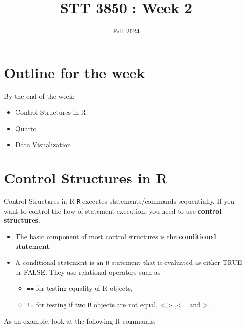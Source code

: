 \documentclass[
  ignorenonframetext,
]{beamer}
\title{STT 3850 : Week 2}
\author{Fall 2024}
\date{}
\institute{Appalachian State University}
\providecommand{\tightlist}{%
  \setlength{\itemsep}{0pt}\setlength{\parskip}{0pt}}
\begin{document}
\frame{\titlepage}

\hypertarget{outline-for-the-week}{%
\section{Outline for the week}\label{outline-for-the-week}}

\begin{frame}{By the end of the week:}
\protect\hypertarget{by-the-end-of-the-week}{}
\begin{itemize}
\tightlist
\item
  Control Structures in R
\item
  \href{https://quarto.org/}{Quarto}
\item
  Data Visualization
\end{itemize}
\end{frame}

\hypertarget{control-structures-in-r}{%
\section{Control Structures in R}\label{control-structures-in-r}}

\begin{frame}[fragile]{Control Structures in R}
\protect\hypertarget{control-structures-in-r-1}{}
\texttt{R} executes statements/commands sequentially. If you want to
control the flow of statement execution, you need to use \textbf{control
structures}.

\begin{itemize}
\item
  The basic component of most control structures is the
  \textbf{conditional statement}.
\item
  A conditional statement is an \texttt{R} statement that is evaluated
  as either TRUE or FALSE. They use relational operators such as

  \begin{itemize}
  \item
    \texttt{==} for testing equality of R objects,
  \item
    \texttt{!=} for testing if two \texttt{R} objects are not equal,
    \textless,\textgreater{} ,\textless= and \textgreater=.
  \end{itemize}
\end{itemize}

As an example, look at the following R commands:
\end{frame}
\end{document}
